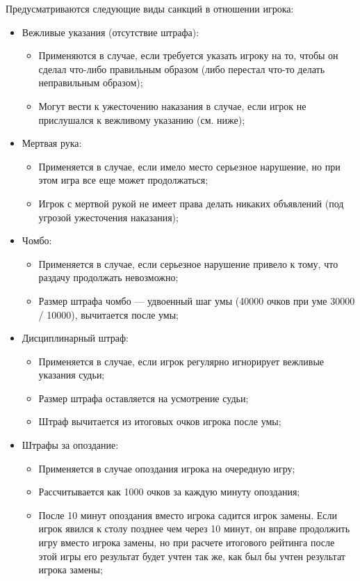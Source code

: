 Предусматриваются следующие виды санкций в отношении игрока:
\begin{itemize}
	\item Вежливые указания (отсутствие штрафа):
	\begin{itemize}
		\item Применяются в случае, если требуется указать игроку на то, чтобы он сделал что-либо правильным образом (либо перестал что-то делать неправильным образом);
		\item Могут вести к ужесточению наказания в случае, если игрок не прислушался к вежливому указанию (см. ниже);
	\end{itemize}
	\item Мертвая рука:
	\begin{itemize}
		\item Применяется в случае, если имело место серьезное нарушение, но при этом игра все еще может продолжаться;
		\item Игрок с мертвой рукой не имеет права делать никаких объявлений (под угрозой ужесточения наказания);
	\end{itemize}
	\item Чомбо:
	\begin{itemize}
		\item Применяется в случае, если серьезное нарушение привело к тому, что раздачу продолжать невозможно;
		\item Размер штрафа чомбо --- удвоенный шаг умы (40000 очков при уме 30000 / 10000), вычитается после умы;
	\end{itemize}
	\item Дисциплинарный штраф:
	\begin{itemize}
		\item Применяется в случае, если игрок регулярно игнорирует вежливые указания судьи;
		\item Размер штрафа оставляется на усмотрение судьи;
		\item Штраф вычитается из итоговых очков игрока после умы;
	\end{itemize}
	\item Штрафы за опоздание:
	\begin{itemize}
		\item Применяется в случае опоздания игрока на очередную игру;
		\item Рассчитывается как 1000 очков за каждую минуту опоздания;
		\item После 10 минут опоздания вместо игрока садится игрок замены. Если игрок явился к столу позднее чем через 10 минут, он вправе продолжить игру вместо игрока замены, но при расчете итогового рейтинга после этой игры его результат будет учтен так же, как был бы учтен результат игрока замены;

\end{itemize}
\end{itemize}
